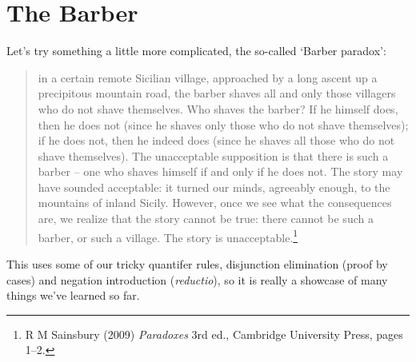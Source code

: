 \section{The Barber}\label{barber}

Let's try something a little more complicated, the so-called `Barber paradox': \begin{quote}
	 in a certain remote Sicilian village, approached by a long ascent up a precipitous mountain road, the barber shaves all and only those villagers who do not shave themselves. Who shaves the barber? If he himself does, then he does not (since he shaves only those who do not shave themselves); if he does not, then he indeed does (since he shaves all those who do not shave themselves).  The unacceptable supposition is that there is such a barber – one who shaves himself if and only if he does not. The story may have sounded acceptable: it turned our minds, agreeably enough, to the mountains of inland Sicily. However, once we see what the consequences are, we realize that the story cannot be true: there cannot be such a barber, or such a village. The story is unacceptable.\footnote{R M Sainsbury (2009) \emph{Paradoxes} 3rd ed., Cambridge University Press, pages 1–2.}
\end{quote} This uses some of our tricky quantifer rules, disjunction elimination (proof by cases) and negation introduction (\emph{reductio}), so it is really a showcase of many things we've learned so far. 

